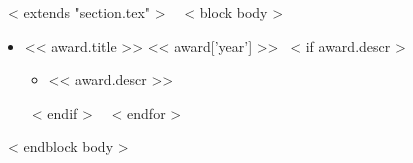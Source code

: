 \vspace{3mm}
~< extends "section.tex" >~
~< block body >~
\begin{itemize}
  ~< for award in items >~
    \item << award.title >> \hfill << award['year'] >>
    ~< if award.descr >~
      \begin{itemize}
      \item << award.descr >>
      \end{itemize}
    ~< endif >~
  ~< endfor >~
\end{itemize}
~< endblock body >~
